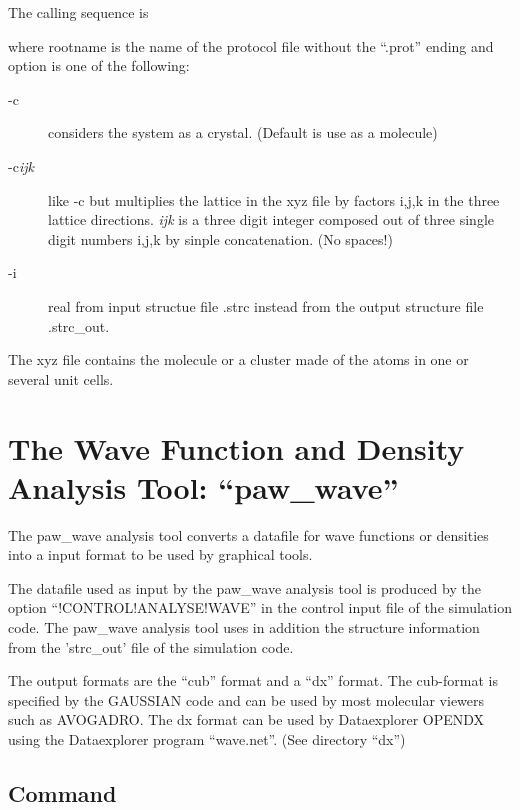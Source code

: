 \documentclass[final,12pt]{article}
\begin{document}
{{{{The calling sequence is

\bigskip{}\bigskip

\noindent
where rootname is the name of the protocol file without the ``.prot''
ending and option is one of the following:
\begin{description}
\item[-c] considers the system as a crystal. (Default is use as a molecule)
\item[-c\textit{ijk}] like -c but multiplies the lattice in the xyz
  file by factors i,j,k in the three lattice directions. \textit{ijk}
  is a three digit integer composed out of three single digit numbers
  i,j,k by sinple concatenation. (No spaces!)
\item[-i] real from input structue file .strc instead from the output
  structure file .strc\_out.
\end{description}

The xyz file contains the molecule or a cluster made of the atoms in
one or several unit cells.


\newpage
\section{The Wave Function and Density Analysis Tool: ``paw\_wave''}
The paw\_wave analysis tool converts a datafile for wave functions or
densities into a input format to be used by graphical tools. 

The datafile used as input by the paw\_wave analysis tool is produced
by the option ``!CONTROL!ANALYSE!WAVE'' in the control input file of
the simulation code. The paw\_wave analysis tool uses in addition 
the structure information from  the 'strc\_out' file of the simulation code.

The output formats are the ``cub'' format and a ``dx'' format.  The
cub-format is specified by the GAUSSIAN code and can be used by most
molecular viewers such as AVOGADRO. The dx format can be used by
Dataexplorer OPENDX \cite{opendx} using the Dataexplorer program
``wave.net''. (See directory ``dx'')

\subsection{Command}

}}}}
\end{document}
